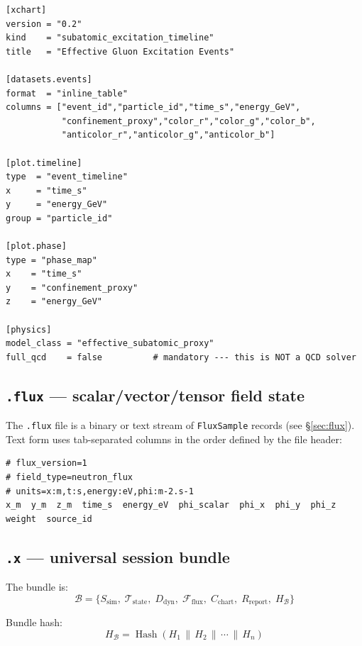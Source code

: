 \documentclass[11pt, a4paper, oneside]{article}
\newcommand{\Bund}{\mathcal{B}}          %
\DeclareMathOperator{\Hash}{Hash}
\begin{document}
\begin{lstlisting}[caption={\texttt{.xchart} --- effective gluon excitation timeline.}]
[xchart]
version = "0.2"
kind    = "subatomic_excitation_timeline"
title   = "Effective Gluon Excitation Events"

[datasets.events]
format  = "inline_table"
columns = ["event_id","particle_id","time_s","energy_GeV",
           "confinement_proxy","color_r","color_g","color_b",
           "anticolor_r","anticolor_g","anticolor_b"]

[plot.timeline]
type  = "event_timeline"
x     = "time_s"
y     = "energy_GeV"
group = "particle_id"

[plot.phase]
type = "phase_map"
x    = "time_s"
y    = "confinement_proxy"
z    = "energy_GeV"

[physics]
model_class = "effective_subatomic_proxy"
full_qcd    = false          # mandatory --- this is NOT a QCD solver
\end{lstlisting}

\subsection{\texttt{.flux} --- scalar/vector/tensor field state}

The \texttt{.flux} file is a binary or text stream of
\texttt{FluxSample} records (see \S\ref{sec:flux}). Text form uses
tab-separated columns in the order defined by the file header:

\begin{lstlisting}[caption={\texttt{.flux} text header.}]
# flux_version=1
# field_type=neutron_flux
# units=x:m,t:s,energy:eV,phi:m-2.s-1
x_m  y_m  z_m  time_s  energy_eV  phi_scalar  phi_x  phi_y  phi_z  weight  source_id
\end{lstlisting}

\subsection{\texttt{.x} --- universal session bundle}

The bundle is:
\begin{equation}
  \Bund = \{S_{\mathrm{sim}},\; \mathcal{T}_{\mathrm{state}},\;
             D_{\mathrm{dyn}},\; \mathcal{F}_{\mathrm{flux}},\;
             C_{\mathrm{chart}},\; R_{\mathrm{report}},\; H_\Bund\}
  \label{eq:bundle}
\end{equation}

Bundle hash:
\begin{equation}
  H_\Bund = \Hash(H_1 \,\|\, H_2 \,\|\, \cdots \,\|\, H_n)
  \label{eq:bundle_hash}
\end{equation}
\end{document}
